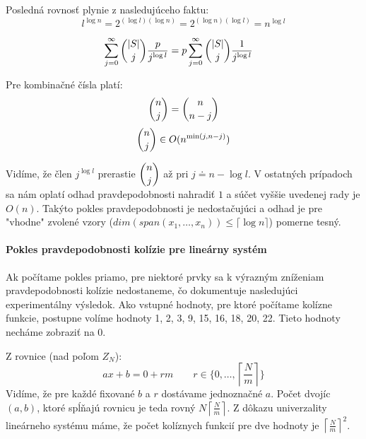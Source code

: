 Posledná rovnosť plynie z nasledujúceho faktu:
\begin{displaymath}
l^{\log n} = 2^{(\log l)(\log n)} = 2^{(\log n)(\log l)} = n^{\log l}
\end{displaymath}

\begin{displaymath}
\begin{split}
\displaystyle \sum_{j=0}^{\infty} \dbinom{|S|}{j}\frac{p}{j^{\log l}} 
	& = p \displaystyle \sum_{j=0}^{\infty} \dbinom{|S|}{j}\frac{1}{j^{\log l}}
\end{split}
\end{displaymath}

Pre kombinačné čísla platí:
\begin{displaymath}
\dbinom{n}{j} = \dbinom{n}{n-j}
\end{displaymath}
\begin{displaymath}
\dbinom{n}{j} \in O(n^{\min(j, n-j)})
\end{displaymath}

Vidíme, že člen $j^{\log l}$ prerastie $\dbinom{n}{j}$ až pri $j \doteq n - \log l$. V ostatných prípadoch sa nám oplatí odhad pravdepodobnosti nahradiť $1$ a súčet vyššie uvedenej rady je $O(n)$. Takýto pokles pravdepodobnosti je nedostačujúci a odhad je pre "vhodne" zvolené vzory ($dim(span(x_1, \dots, x_n)) \leq \lceil \log n \rceil$) pomerne tesný.

\paragraph{Pokles pravdepodobnosti kolízie pre lineárny systém}

Ak počítame pokles priamo, pre niektoré prvky sa k výrazným zníženiam pravdepodobnosti kolízie nedostaneme, čo dokumentuje nasledujúci experimentálny výsledok. Ako vstupné hodnoty, pre ktoré počítame kolízne funkcie, postupne volíme hodnoty 1, 2, 3, 9, 15, 16, 18, 20, 22. Tieto hodnoty necháme zobraziť na $0$.

Z rovnice (nad poľom $Z_N$):
\begin{displaymath}
ax + b = 0 + rm \qquad r \in \{0, \dots, \left\lceil \frac{N}{m} \right\rceil \}
\end{displaymath}
Vidíme, že pre každé fixované $b$ a $r$ dostávame jednoznačné $a$. Počet dvojíc $(a, b)$, ktoré spĺňajú rovnicu je teda rovný $N \left\lceil \frac{N}{m} \right\rceil$. Z dôkazu univerzality lineárneho systému máme, že počet kolíznych funkcií pre dve hodnoty je ${\left\lceil \frac{N}{m} \right\rceil}^2$.

